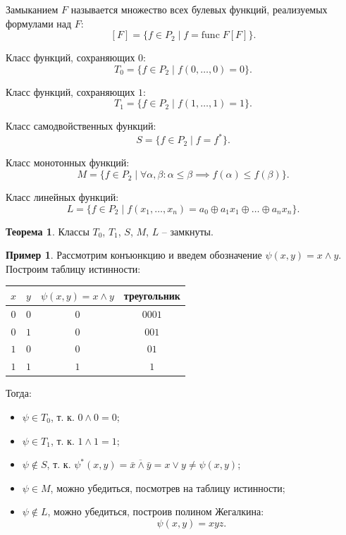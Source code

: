 \documentclass[a5paper, 11pt]{extarticle}
\theoremstyle{definition}
\newtheorem*{theorem*}{Теорема}
\newtheorem*{example*}{Пример}
\theoremstyle{definition}
\theoremstyle{definition}
\numberwithin{figure}{section}
\numberwithin{table}{section}
\begin{document}
Замыканием \(F\) называется множество всех булевых функций, реализуемых формулами над \(F\):
\[
    [F] = \{f \in P_2 \mid f = \text{func} \; F [F]\}.
\]

Класс функций, сохраняющих \(0\):
\[
    T_0 = \{f \in P_2 \mid f(0, \ldots, 0) = 0\}.
\]

Класс функций, сохраняющих \(1\):
\[
    T_1 = \{f \in P_2 \mid f(1, \ldots, 1) = 1\}.
\]

Класс самодвойственных функций:
\[
    S = \{f \in P_2 \mid f = f^*\}.
\]

Класс монотонных функций:
\[
    M = \{f \in P_2 \mid \forall \alpha, \beta : \alpha \leq \beta \implies f(\alpha) \leq f(\beta)\}.
\]

Класс линейных функций:
\[
    L = \{f \in P_2 \mid f(x_1, \ldots, x_n) = a_0 \oplus a_1 x_1 \oplus \ldots \oplus a_n x_n\}.
\]

\begin{theorem*}
    Классы \(T_0\), \(T_1\), \(S\), \(M\), \(L\) -- замкнуты.
\end{theorem*}

\begin{example*}
    Рассмотрим конъюнкцию и введем обозначение \(\psi(x, y) = x \land y\). Построим таблицу истинности:
    {
    \renewcommand*{\arraystretch}{1.5}
    \begin{longtable}{|c|c|c|c|}
        \hline
        \(x\) & \(y\) & \(\psi(x, y) = x \land y\) & треугольник \\
        \hline
        \(0\) & \(0\) & \(0\)                      & \(0001\)    \\
        \hline
        \(0\) & \(1\) & \(0\)                      & \(001\)     \\
        \hline
        \(1\) & \(0\) & \(0\)                      & \(01\)      \\
        \hline
        \(1\) & \(1\) & \(1\)                      & \(1\)       \\
        \hline
    \end{longtable}
    }
    Тогда:
    \begin{itemize}
        \item \(\psi \in T_0\), т. к. \(0 \land 0 = 0\);
        \item \(\psi \in T_1\), т. к. \(1 \land 1 = 1\);
        \item \(\psi \notin S\), т. к. \(\psi^*(x, y) = \overline{\bar{x} \land \bar{y}} = x \lor y \neq \psi(x, y)\);
        \item \(\psi \in M\), можно убедиться, посмотрев на таблицу истинности;
        \item \(\psi \notin L\), можно убедиться, построив полином Жегалкина:
              \[
                  \psi(x, y) = xyz.
              \]
    \end{itemize}
\end{example*}
\end{document}
